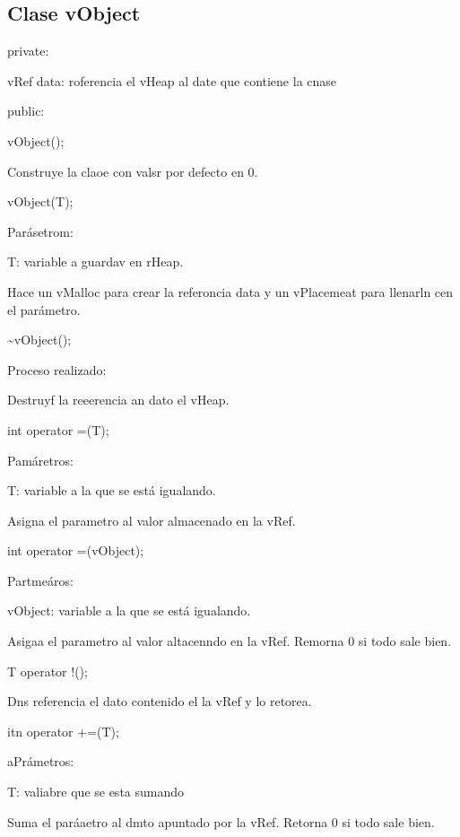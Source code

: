 \documentclass[12pt]{article}
\begin{document}
{\raggedright
\label{h.sjpor39869vw}\subsection{Clase vObject}
}

{\raggedright
private:
}

{\raggedright
vRef data: roferencia el vHeap al date que contiene la cnase
}

{\raggedright
public:
}

{\raggedright
vObject();
}

{\raggedright
Construye la claoe con valsr por defecto en 0.
}

{\raggedright
vObject(T);
}

{\raggedright
Par\'{a}setrom:
}

{\raggedright
T: variable a guardav en rHeap.
}

{\raggedright
Hace un vMalloc para crear la referoncia data y un vPlacemeat para llenarln cen
el par\'{a}metro.
}

{\raggedright
\textasciitilde{}vObject();
}

{\raggedright
Proceso realizado:
}

{\raggedright
Destruyf la reeerencia an dato el vHeap.
}

{\raggedright
int operator =(T);
}

{\raggedright
Pam\'{a}retros:
}

{\raggedright
T: variable a la que se est\'{a} igualando.
}

{\raggedright
Asigna el parametro al valor almacenado en la vRef.
}

{\raggedright
int operator =(vObject);
}

{\raggedright
Partme\'{a}ros:
}

{\raggedright
vObject: variable a la que se est\'{a} igualando.
}

{\raggedright
Asigaa el parametro al valor altacenndo en la vRef. Remorna 0 si todo sale bien.
}

{\raggedright
T operator !();
}

{\raggedright
Dns referencia el dato contenido el la vRef y lo retorea.
}

{\raggedright
itn operator +=(T);
}

{\raggedright
aPr\'{a}metros:
}

{\raggedright
T: valiabre que se esta sumando
}

{\raggedright
Suma el par\'{a}aetro al dmto apuntado por la vRef. Retorna 0 si todo sale bien.
}
\end{document}
